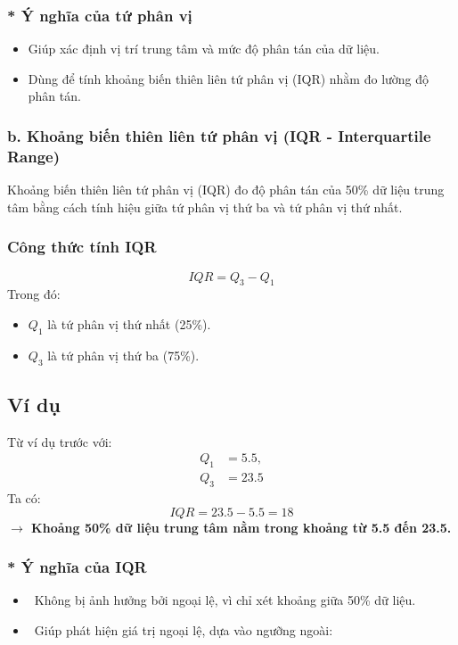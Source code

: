 \subsubsection*{* Ý nghĩa của tứ phân vị}
\begin{itemize}
    \item Giúp xác định vị trí trung tâm và mức độ phân tán của dữ liệu.
    \item Dùng để tính khoảng biến thiên liên tứ phân vị (IQR) nhằm đo lường độ phân tán.
\end{itemize}


\subsubsection*{b. Khoảng biến thiên liên tứ phân vị (IQR - Interquartile Range)}
Khoảng biến thiên liên tứ phân vị (IQR) đo độ phân tán của 50\% dữ liệu trung tâm bằng cách tính hiệu giữa tứ phân vị thứ ba và tứ phân vị thứ nhất.

\subsubsection*{Công thức tính IQR}
\begin{equation}
    IQR = Q_3 - Q_1
\end{equation}
Trong đó:
\begin{itemize}
    \item $Q_1$ là tứ phân vị thứ nhất (25\%).
    \item $Q_3$ là tứ phân vị thứ ba (75\%).
\end{itemize}

\subsection*{Ví dụ}
Từ ví dụ trước với:
\begin{align*}
    Q_1 &= 5.5,\\
    Q_3 &= 23.5
\end{align*}
Ta có:
\begin{equation}
    IQR = 23.5 - 5.5 = 18
\end{equation}
\textbf{$\rightarrow$ Khoảng 50\% dữ liệu trung tâm nằm trong khoảng từ 5.5 đến 23.5.}

\subsubsection*{* Ý nghĩa của IQR}
\begin{itemize}
    \item \checkmark\ Không bị ảnh hưởng bởi ngoại lệ, vì chỉ xét khoảng giữa 50\% dữ liệu.
    \item \checkmark\ Giúp phát hiện giá trị ngoại lệ, dựa vào ngưỡng ngoài:
\end{itemize}

